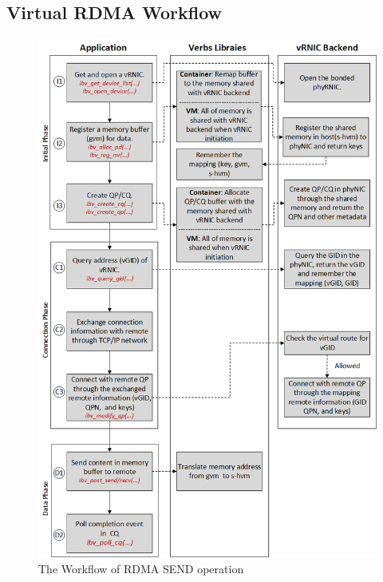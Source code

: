 \subsection{Virtual RDMA Workflow}

\begin{figure}[!ht]
	\centering
	\includegraphics[width=1\linewidth]{images/RDMA-path.png}
	\caption{The Workflow of RDMA SEND operation}
	\label{fig:route-config}
\end{figure}

